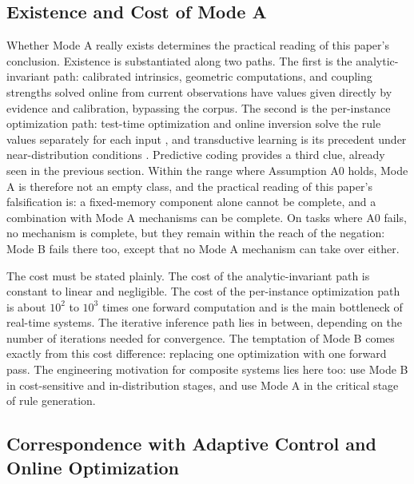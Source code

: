 \subsection{Existence and Cost of Mode A}
\label{sec:cost}

Whether Mode A really exists determines the practical reading of this paper's conclusion. Existence is substantiated along two paths. The first is the analytic-invariant path: calibrated intrinsics, geometric computations, and coupling strengths solved online from current observations have values given directly by evidence and calibration, bypassing the corpus. The second is the per-instance optimization path: test-time optimization and online inversion solve the rule values separately for each input \citep{sun2020}, and transductive learning is its precedent under near-distribution conditions \citep{vapnik1995}. Predictive coding provides a third clue, already seen in the previous section. Within the range where Assumption A0 holds, Mode A is therefore not an empty class, and the practical reading of this paper's falsification is: a fixed-memory component alone cannot be complete, and a combination with Mode A mechanisms can be complete. On tasks where A0 fails, no mechanism is complete, but they remain within the reach of the negation: Mode B fails there too, except that no Mode A mechanism can take over either.

The cost must be stated plainly. The cost of the analytic-invariant path is constant to linear and negligible. The cost of the per-instance optimization path is about $10^2$ to $10^3$ times one forward computation and is the main bottleneck of real-time systems. The iterative inference path lies in between, depending on the number of iterations needed for convergence. The temptation of Mode B comes exactly from this cost difference: replacing one optimization with one forward pass. The engineering motivation for composite systems lies here too: use Mode B in cost-sensitive and in-distribution stages, and use Mode A in the critical stage of rule generation.

\subsection{Correspondence with Adaptive Control and Online Optimization}

